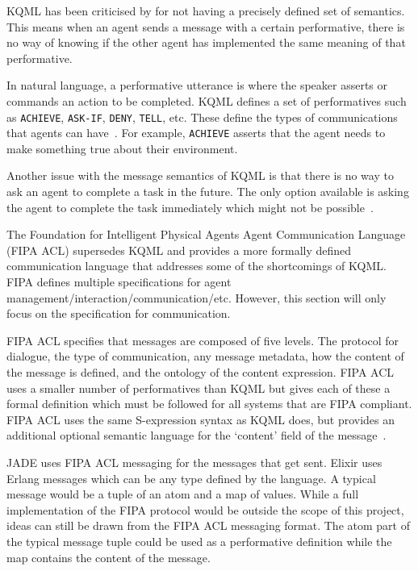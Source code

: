 KQML has been criticised by  for not having a precisely defined set of semantics.
This means when an agent sends a message with a certain performative, there is no way of knowing if the other agent has implemented the same meaning of that performative.

In natural language, a performative utterance is where the speaker asserts or commands an action to be completed.
KQML defines a set of performatives such as \verb|ACHIEVE|, \verb|ASK-IF|, \verb|DENY|, \verb|TELL|, etc.
These define the types of communications that agents can have~\cite{cohen1995communicative}.
For example, \verb|ACHIEVE| asserts that the agent needs to make something true about their environment.

Another issue with the message semantics of KQML is that there is no way to ask an agent to complete a task in the future.
The only option available is asking the agent to complete the task immediately which might not be possible~\cite{cohen1995communicative}.

The Foundation for Intelligent Physical Agents Agent Communication Language (FIPA ACL) supersedes KQML and provides a more formally defined communication language that addresses some of the shortcomings of KQML\@.
FIPA defines multiple specifications for agent management/interaction/communication/etc.
However, this section will only focus on the specification for communication.

FIPA ACL specifies that messages are composed of five levels.
The protocol for dialogue, the type of communication, any message metadata, how the content of the message is defined, and the ontology of the content expression.
FIPA ACL uses a smaller number of performatives than KQML but gives each of these a formal definition which must be followed for all systems that are FIPA compliant.
FIPA ACL uses the same S-expression syntax as KQML does, but provides an additional optional semantic language for the `content' field of the message~\cite{obrien1998fipa}.

JADE uses FIPA ACL messaging for the messages that get sent.
Elixir uses Erlang messages which can be any type defined by the language.
A typical message would be a tuple of an atom and a map of values.
While a full implementation of the FIPA protocol would be outside the scope of this project, ideas can still be drawn from the FIPA ACL messaging format.
The atom part of the typical message tuple could be used as a performative definition while the map contains the content of the message.
